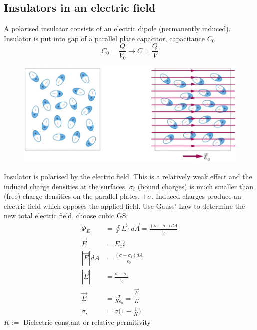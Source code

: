\documentclass[a4paper, 11pt, normalem]{report}
\begin{document}
\section{Insulators in an electric field}
A polarised insulator consists of an electric dipole (permanently induced).
Insulator is put into gap of a parallel plate capacitor, capacitance $C_{0}$
\begin{equation}
    C_{0} = \frac{Q}{V_{0}} \to C = \frac{Q}{V}
\end{equation}
\begin{figure}[H]
    \centering
    \includegraphics[scale=0.4]{Diploes.png}
\end{figure}
Insulator is polarised by the electric field. 
This is a relatively weak effect and the induced charge densities at the surfaces, $\sigma_{i}$ (bound charges) is much smaller than (free) charge densities on the parallel plates, $\pm \sigma$. 
Induced charges produce an electric field which opposes the applied field.
Use Gauss' Law to determine the new total electric field, choose cubic GS:
\begin{align}
    \Phi_{E} &= \oint \vec{E} \cdot d\vec{A} = \frac{(\sigma - \sigma_{i})dA}{\epsilon_{0}} \\
    \vec{E} &= E_{x} \hat{i} \\
    |\vec{E}| dA &= \frac{(\sigma - \sigma_{i})dA}{\epsilon_{0}} \\
    |\vec{E}| &= \frac{\sigma - \sigma_{i}}{\epsilon_{0}} \\
    \vec{E} &= \frac{\sigma}{K \epsilon_{0}} = \frac{|\vec{E}|}{K} \\
    \sigma_{i} &= \sigma \Big(1 - \frac{1}{K} \Big)
\end{align}
$K :=$ Dielectric constant or relative permitivity

\chapter{}
\end{document}
